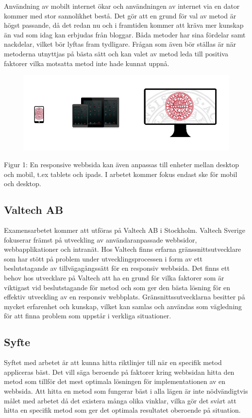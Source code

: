 \documentclass[11pt]{article}
\begin{document}
Användning av mobilt internet ökar och användningen av internet via en dator kommer med stor sannolikhet bestå. Det gör att en grund för val av metod är högst passande, då det redan nu och i framtiden kommer att kräva mer kunskap än vad som idag kan erbjudas från bloggar. Båda metoder har sina fördelar samt nackdelar, vilket bör lyftas fram tydligare. Frågan som även bör ställas är när metoderna utnyttjas på bästa sätt och kan valet av metod leda till positiva faktorer vilka motsatta metod inte hade kunnat uppnå.

\begin{figure}[h]
\centerline{%
\includegraphics[scale=0.6]{pics/olikaenheter.png}
}
\end{figure}
\vspace{1.5cm}
Figur 1: En responsive webbsida kan även anpassas till enheter mellan desktop och mobil, t.ex  tablets och ipads.  I arbetet kommer fokus endast ske för mobil och desktop.


\subsection{Valtech AB}
Examensarbetet kommer att utföras på Valtech AB i Stockholm. Valtech Sverige fokuserar främst på utveckling av användaranpassade webbsidor, webbapplikationer och intranät. Hos Valtech finns erfarna gränssnittsutvecklare som har stött på problem under utvecklingsprocessen i form av ett beslutstagande av tillvägagångssätt för en responsiv webbsida. Det finns ett behov hos utvecklare på Valtech att ha en grund för vilka faktorer som är viktigast vid beslutstagande för metod och som ger den bästa lösning för en effektiv utveckling av en responsiv webbplats. Gränsnittssutvecklarna besitter på mycket erfarenhet och kunskap, vilket kan samlas och användas som vägledning för att finna problem som uppstår i verkliga situationer.

\subsection{Syfte}
Syftet med arbetet är att kunna hitta riktlinjer till när en specifik metod appliceras bäst. Det vill säga beroende på faktorer kring webbsidan hitta den metod som tillför det mest optimala lösningen för implementationen av en webbsida. Att hitta en metod som fungerar bäst i alla lägen är inte nödvändigtvis målet med arbetet då det existera många olika vinklar, vilka gör det svårt att hitta en specifik metod som ger det optimala resultatet oberoende på situation.
\end{document}
